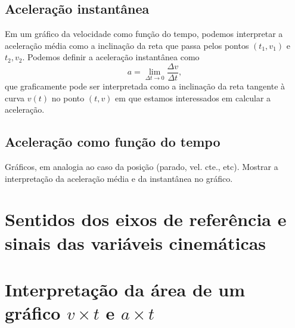 \subsection{Aceleração instantânea}

Em um gráfico da velocidade como função do tempo, podemos interpretar a aceleração média como a inclinação da reta que passa pelos pontos $(t_1,v_1)$ e $t_2,v_2$. Podemos definir a aceleração instantânea como
\begin{equation}
  a = \lim_{\Delta t \to 0} \frac{\Delta v}{\Delta t},
\end{equation}
%
que graficamente pode ser interpretada como a inclinação da reta tangente à curva $v(t)$ no ponto $(t,v)$ em que estamos interessados em calcular a aceleração.

\subsection{Aceleração como função do tempo}

Gráficos, em analogia ao caso da posição (parado, vel. cte., etc). Mostrar a interpretação da aceleração média e da instantânea no gráfico.

\section{Sentidos dos eixos de referência e sinais das variáveis cinemáticas}

\section{Interpretação da área de um gráfico $v \times t$ e $a \times t$}

